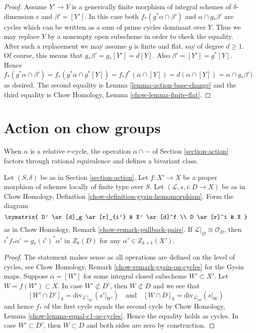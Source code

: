 \begin{proof}
\medskip\noindent
Assume $Y' \to Y$ is a generically finite morphism of integral schemes
of $\delta$-dimension $e$ and $\beta' = [Y']$. In this case both
$f_*(g^*\alpha \cap \beta')$ and $\alpha \cap g_*\beta'$ are cycles
which can be written as a sum of prime cycles dominant over $Y$.
Thus we may replace $Y$ by a nonempty open subscheme in order to
check the equality. After such a replacement we may assume $g$ is
finite and flat, say of degree $d \geq 1$. Of course, this means
that $g_*\beta' = g_*[Y'] = d[Y]$. Also $\beta' = [Y'] = g^*[Y]$. Hence
$$
f_*(g^*\alpha \cap \beta') =
f_*(g^*\alpha \cap g^*[Y]) =
f_*f^*(\alpha \cap [Y]) =
d (\alpha \cap [Y]) =
\alpha \cap g_*\beta')
$$
as desired. The second equality is Lemma \ref{lemma-action-base-change}
and the third equality is Chow Homology, Lemma \ref{chow-lemma-finite-flat}.
\end{proof}







\section{Action on chow groups}
\label{section-action-chow}

\noindent
When $\alpha$ is a relative $r$-cycle, the operation $\alpha \cap -$
of Section \ref{section-action} factors through rational equivalence
and defines a bivariant class.

\begin{lemma}
\label{lemma-closed-in-X-gysin}
Let $(S, \delta)$ be as in Section \ref{section-action}.
Let $f : X' \to X$ be a proper morphism of schemes
locally of finite type over $S$.
Let $(\mathcal{L}, s, i : D \to X)$ be as in
Chow Homology, Definition \ref{chow-definition-gysin-homomorphism}.
Form the diagram
$$
\xymatrix{
D' \ar[d]_g \ar[r]_{i'} & X' \ar[d]^f \\
D \ar[r]^i & X
}
$$
as in Chow Homology, Remark \ref{chow-remark-pullback-pairs}.
If $\mathcal{L}|_D \cong \mathcal{O}_D$, then
$i^*f_*\alpha' = g_*(i')^*\alpha'$ in $Z_k(D)$
for any $\alpha' \in Z_{k + 1}(X')$.
\end{lemma}

\begin{proof}
The statement makes sense as all operations are defined on the level
of cycles, see Chow Homology, Remark \ref{chow-remark-gysin-on-cycles}
for the Gysin maps.
Suppose $\alpha = [W']$ for some integral closed subscheme
$W' \subset X'$. Let $W = f(W') \subset X$. In case $W' \not \subset D'$,
then $W \not \subset D$ and we see that
$$
[W' \cap D']_k = \text{div}_{\mathcal{L}'|_{W'}}({s'|_{W'}})
\quad\text{and}\quad
[W \cap D]_k = \text{div}_{\mathcal{L}|_W}(s|_W)
$$
and hence $f_*$ of the first cycle equals the second cycle by
Chow Homology, Lemma \ref{chow-lemma-equal-c1-as-cycles}. Hence the
equality holds as cycles. In case $W' \subset D'$, then
$W \subset D$ and both sides are zero by construction.
\end{proof}

